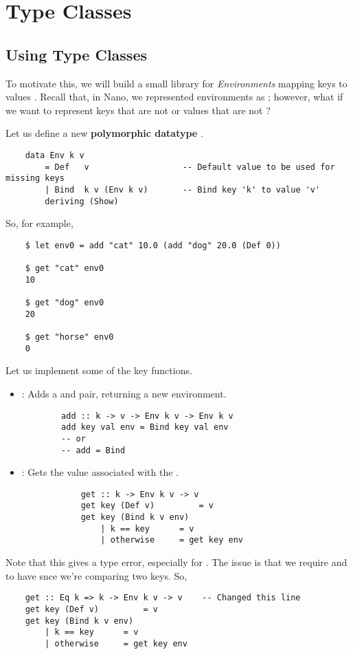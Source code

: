 \documentclass[letterpaper]{article}
\begin{document}
\section{Type Classes}
\subsection{Using Type Classes}
To motivate this, we will build a small library for \emph{Environments} mapping keys  to values . Recall that, in Nano, we represented environments as \code{[(Id, Value)]}; however, what if we want to represent keys that are not  or values that are not ?

\bigskip 

Let us define a new \textbf{polymorphic datatype} . 
\begin{verbatim}
    data Env k v 
        = Def   v                   -- Default value to be used for missing keys 
        | Bind  k v (Env k v)       -- Bind key 'k' to value 'v'
        deriving (Show)\end{verbatim}

So, for example, 
\begin{verbatim}
    $ let env0 = add "cat" 10.0 (add "dog" 20.0 (Def 0))

    $ get "cat" env0 
    10 

    $ get "dog" env0 
    20 

    $ get "horse" env0 
    0\end{verbatim}

Let us implement some of the key functions. 
\begin{itemize}
    \item {}: Adds a  and  pair, returning a new environment. 
    \begin{verbatim}
        add :: k -> v -> Env k v -> Env k v 
        add key val env = Bind key val env 
        -- or
        -- add = Bind\end{verbatim}

    \item {}: Gets the value associated with the .
        \begin{verbatim}
            get :: k -> Env k v -> v 
            get key (Def v)         = v
            get key (Bind k v env)
                | k == key      = v
                | otherwise     = get key env \end{verbatim}
\end{itemize}
Note that this gives a type error, especially for . The issue is that we require  and  to have  snce we're comparing two keys. So,
\begin{verbatim}
    get :: Eq k => k -> Env k v -> v    -- Changed this line 
    get key (Def v)         = v
    get key (Bind k v env)
        | k == key      = v
        | otherwise     = get key env \end{verbatim}
\end{document}
